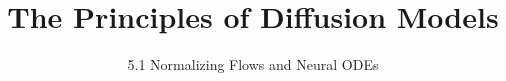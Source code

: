 
\title{The Principles of Diffusion Models}
\subtitle{5.1 Normalizing Flows and Neural ODEs}


\begin{frame}
    \titlepage
\end{frame}


